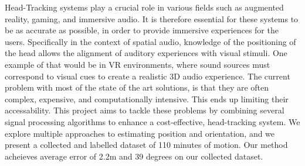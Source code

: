 Head-Tracking systems play a crucial role in various fields such as augmented reality, gaming, and immersive audio. It is therefore essential for these systems to be as accurate as possible, in order to provide immersive experiences for the users. Specifically in the context of spatial audio, knowledge of the positioning of the head allows the alignment of auditory experiences with visual stimuli. One example of that would be in VR environments, where sound sources must correspond to visual cues to create a realistic 3D audio experience. The current problem with most of the state of the art solutions, is that they are often complex, expensive, and computationally intensive. This ends up limiting their accessability.  This project aims to tackle these problems by combining several signal processing algorithms to enhance a cost-effective, head-tracking system. We explore multiple approaches to estimating position and orientation, and we present a collected and labelled dataset of 110 minutes of motion. Our method acheieves average error of 2.2m and 39 degrees on our collected dataset.